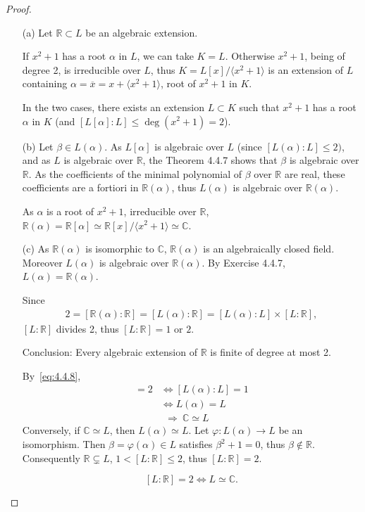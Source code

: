 \documentclass[11pt,a4paper]{article}
\newcommand{\R}{\mathbb{R}}
\newcommand{\C}{\mathbb{C}}
\begin{document}
\begin{proof}
\begin{enumerate}
\item[(a)]
Let $\R \subset L$ be an algebraic extension. 

If  $x^2+1$ has a root $\alpha$ in $L$, we can take  $K=L$. Otherwise $x^2+1$, being of degree 2, is irreducible over $L$, thus $K = L[x]/\langle x^2 +1\rangle$ is an extension of $L$ containing $\alpha = \overline{x} = x +\langle x^2 +1\rangle $, root of $x^2+1$ in $K$. 

In the two cases, there exists  an extension $L \subset K$ such that $x^2+1$ has a root $\alpha$ in $K$ (and $ [L[\alpha]:L] \leq \deg(x^2+1) = 2$).

\item[(b)] Let $\beta \in L(\alpha)$. As $L[\alpha]$ is algebraic over $L$ (since $[L(\alpha) : L] \leq 2)$, and as $L$ is algebraic over $\R$, the Theorem 4.4.7 shows that $\beta$ is algebraic over $\R$. As the coefficients of the minimal polynomial of $\beta$ over $\R$ are real, these coefficients are a fortiori in $\R(\alpha)$, thus $L(\alpha)$ is algebraic over $\R(\alpha)$.

As  $\alpha$ is a root of $x^2+1$, irreducible over $\R$, $\R(\alpha) = \R[\alpha] \simeq \R[x]/\langle x^2+1\rangle \simeq \C$.

\item[(c)] 
As $\R(\alpha)$ is isomorphic to $\C$, $\R(\alpha)$ is an algebraically closed field. Moreover $L(\alpha)$ is algebraic over $\R(\alpha)$. By Exercise 4.4.7, $L(\alpha)=\R(\alpha)$.

Since
\begin{align}
2={[ \R(\alpha):\R]} = [L(\alpha) : \R] =  [L(\alpha) : L] \times [L:\R], \label{eq:4.4.8}
\end{align}
$[L:\R]$ divides 2, thus  $[L:\R] =  1$ or $2$.

Conclusion: Every algebraic extension of $\R$ is finite of degree at most 2.

By~\eqref{eq:4.4.8}, 
\begin{align*}
[L:\R] = 2 &\iff [L(\alpha) : L] = 1\\
&\iff L(\alpha) = L\\
&\ \ \Rightarrow\  \C\simeq L
\end{align*}
Conversely, if $\C \simeq L$, then $L(\alpha) \simeq L$. Let $\varphi : L(\alpha) \to L$ be an isomorphism. Then $\beta = \varphi(\alpha)\in L$ satisfies $\beta^2 +1 = 0$, thus $\beta \not \in \R$. Consequently $\R \subsetneq L$, $1<[L : \R]\leq 2$, thus $[L:\R]= 2$.

$$[L:\R] = 2 \iff L \simeq \C.$$
\end{enumerate}
\end{proof}
\end{document}
